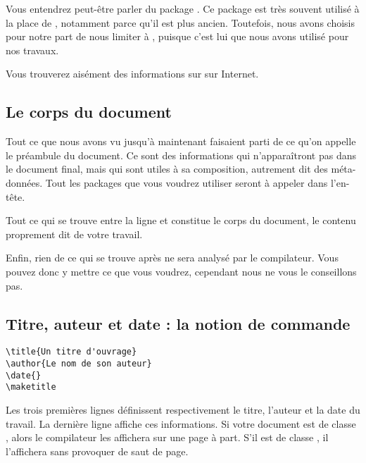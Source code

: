 \begin{anedocte}
Vous entendrez peut-être parler du package . Ce package est très souvent utilisé à la place de , notamment parce qu'il est plus ancien. Toutefois, nous avons choisis pour notre part de nous limiter à , puisque c'est lui que nous avons utilisé pour nos travaux.

Vous trouverez aisément des informations sur  sur Internet.

\end{anedocte}

\subsection{Le corps du document}

Tout ce que nous avons vu jusqu'à maintenant faisaient parti de ce qu'on appelle le préambule du document.\label{preambule} Ce sont des informations qui n'apparaîtront pas dans le document final, mais qui sont utiles à sa composition, autrement dit des méta-données. Tout les packages que vous voudrez utiliser seront à appeler dans l'en-tête.

Tout ce qui se trouve entre la ligne \verb|| et \verb|| constitue le corps du document, le contenu proprement dit de votre travail.

Enfin, rien de ce qui se trouve après \verb|| ne sera analysé par le compilateur. Vous pouvez donc y mettre ce que vous voudrez, cependant nous ne vous le conseillons pas.

\subsection{Titre, auteur et date : la notion de commande}\label{notioncommande}

\begin{verbatim}
\title{Un titre d'ouvrage}
\author{Le nom de son auteur}
\date{}
\maketitle
\end{verbatim}

Les trois premières lignes définissent respectivement le titre, l'auteur et la date du travail.  
La dernière ligne affiche ces informations. Si votre document est de classe  , alors le compilateur les affichera sur une page à part. S'il est de classe  , il l'affichera sans provoquer de saut de page.

